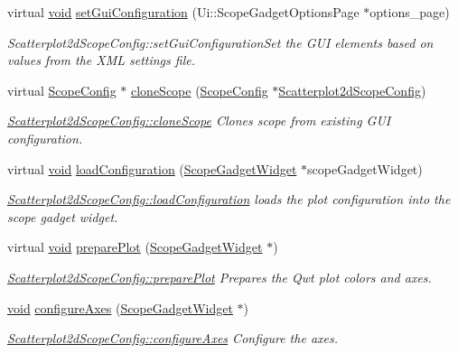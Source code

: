 \begin{DoxyCompactItemize}
\item 
virtual \hyperlink{group___u_a_v_objects_plugin_ga444cf2ff3f0ecbe028adce838d373f5c}{void} \hyperlink{group___scope_plugin_gafe1bd9bbdc9859af7a5d0ad561172a16}{set\-Gui\-Configuration} (\-Ui\-::\-Scope\-Gadget\-Options\-Page $\ast$options\-\_\-page)
\begin{DoxyCompactList}\small\item\em \-Scatterplot2d\-Scope\-Config\-::set\-Gui\-Configuration\-Set the \-G\-U\-I elements based on values from the \-X\-M\-L settings file. \end{DoxyCompactList}\item 
virtual \hyperlink{class_scope_config}{\-Scope\-Config} $\ast$ \hyperlink{group___scope_plugin_ga71ae0bb572870f67432575772c3093f8}{clone\-Scope} (\hyperlink{class_scope_config}{\-Scope\-Config} $\ast$\hyperlink{class_scatterplot2d_scope_config}{\-Scatterplot2d\-Scope\-Config})
\begin{DoxyCompactList}\small\item\em \hyperlink{group___scope_plugin_ga71ae0bb572870f67432575772c3093f8}{\-Scatterplot2d\-Scope\-Config\-::clone\-Scope} \-Clones scope from existing \-G\-U\-I configuration. \end{DoxyCompactList}\item 
virtual \hyperlink{group___u_a_v_objects_plugin_ga444cf2ff3f0ecbe028adce838d373f5c}{void} \hyperlink{group___scope_plugin_ga33b7752470b6c5d32b9aaf1b95faf0f7}{load\-Configuration} (\hyperlink{class_scope_gadget_widget}{\-Scope\-Gadget\-Widget} $\ast$scope\-Gadget\-Widget)
\begin{DoxyCompactList}\small\item\em \hyperlink{group___scope_plugin_ga33b7752470b6c5d32b9aaf1b95faf0f7}{\-Scatterplot2d\-Scope\-Config\-::load\-Configuration} loads the plot configuration into the scope gadget widget. \end{DoxyCompactList}\item 
virtual \hyperlink{group___u_a_v_objects_plugin_ga444cf2ff3f0ecbe028adce838d373f5c}{void} \hyperlink{group___scope_plugin_ga7ff8815549e33c472a7ada6080401b38}{prepare\-Plot} (\hyperlink{class_scope_gadget_widget}{\-Scope\-Gadget\-Widget} $\ast$)
\begin{DoxyCompactList}\small\item\em \hyperlink{group___scope_plugin_ga7ff8815549e33c472a7ada6080401b38}{\-Scatterplot2d\-Scope\-Config\-::prepare\-Plot} \-Prepares the \-Qwt plot colors and axes. \end{DoxyCompactList}\item 
\hyperlink{group___u_a_v_objects_plugin_ga444cf2ff3f0ecbe028adce838d373f5c}{void} \hyperlink{group___scope_plugin_ga420168b2c6740e98666d76cf58bfb2ee}{configure\-Axes} (\hyperlink{class_scope_gadget_widget}{\-Scope\-Gadget\-Widget} $\ast$)
\begin{DoxyCompactList}\small\item\em \hyperlink{group___scope_plugin_ga420168b2c6740e98666d76cf58bfb2ee}{\-Scatterplot2d\-Scope\-Config\-::configure\-Axes} \-Configure the axes. \end{DoxyCompactList}\end{DoxyCompactItemize}


